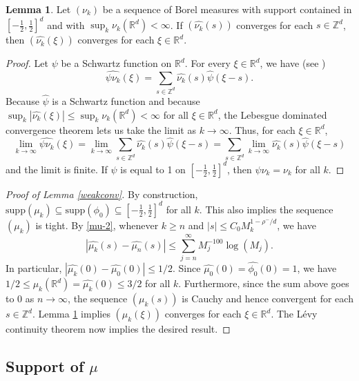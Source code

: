 \documentclass{amsart}
\numberwithin{equation}{section}
\theoremstyle{definition}
\newtheorem{lemma}[theorem]{Lemma}
\theoremstyle{definition}
\def\RR{\mathbb{R}}
\def\ZZ{\mathbb{Z}}
\def\supp{\mathrm{supp}}
\begin{document}
\begin{lemma}\label{convseries}
Let $(\nu_k)$ be a sequence of Borel measures with support contained in $[-\frac{1}{2},\frac{1}{2}]^d$ and with $\sup_k \nu_k(\RR^d) < \infty$. If $(\widehat{\nu_k}(s))$ converges for each $s \in \mathbb{Z}^d$, then $(\widehat{\nu_k}(\xi))$ converges for each $\xi \in \mathbb{R}^d$. 
\end{lemma}
\begin{proof}
Let $\psi$ be a Schwartz function on $\RR^d$. 
For every $\xi \in \mathbb{R}^d$, we have (see \cite[Eq. (110)]{wolff-book}) 
\[\widehat{\psi \nu_k}(\xi) = \sum_{s \in \mathbb{Z}^d} \widehat{\nu_k}(s) \widehat{\psi}(\xi - s).\] 
Because $\widehat{\psi}$ is a Schwartz function and because $\sup_k |\widehat{\nu_k}(\xi)| \leq \sup_k \nu_k(\RR^d) < \infty$ for all $\xi \in \mathbb{R}^d$, the Lebesgue dominated convergence theorem lets us take the limit as $k \to \infty$. Thus, for each  $\xi \in \RR^d$, 
\[\lim_{k \to \infty} \widehat{\psi \nu_k}(\xi) = \lim_{k \to \infty} \sum_{s \in \mathbb{Z}^d} \widehat{\nu_k}(s) \widehat{\psi}(\xi - s) = \sum_{s \in \mathbb{Z}^d} \lim_{k \to \infty} \widehat{\nu_k}(s) \widehat{\psi}(\xi - s) \]
and the limit is finite. If $\psi$ is equal to 1 on $[-\frac{1}{2},\frac{1}{2}]^d$, then $\psi \nu_k = \nu_k$ for all $k$. 
\end{proof}
\begin{proof}[Proof of Lemma \ref{weakconv}] 
By construction, $\supp(\mu_k) \subseteq \supp(\phi_0) \subseteq [-\frac{1}{2},\frac{1}{2}]^d$ for all $k$. This also implies the sequence $(\mu_k)$ is tight. 
By \eqref{mu-2}, whenever $k \geq n$ and 
$|s| \leq C_0 M_k^{1-\rho^{-}/d}$,
we have 
\[\left|\widehat{\mu_{k}}(s) - \widehat{\mu_{n}}(s) \right| \leq \sum_{j=n}^{\infty} M_j^{-100} \log(M_j).\]
In particular, $|\widehat{\mu_k}(0) - \widehat{\mu_0}(0)| \leq 1/2$. 
Since $\widehat{\mu_0}(0)= \widehat{\phi_0}(0) = 1$,  we have $1/2 \leq \mu_k(\RR^d) = \widehat{\mu_k}(0) \leq 3/2$ for all $k$. 
Furthermore, since the sum above goes to $0$ as $n \to \infty$, the sequence $(\mu_k(s))$ is Cauchy and hence convergent for each $s \in \ZZ^d$. 
Lemma \ref{convseries} implies $(\mu_k(\xi))$ converges for each $\xi \in \RR^d$. 
The Lévy continuity theorem now implies the desired result. 
\end{proof}






\subsection{Support of \texorpdfstring{$\mu$}{mu}}
\end{document}
